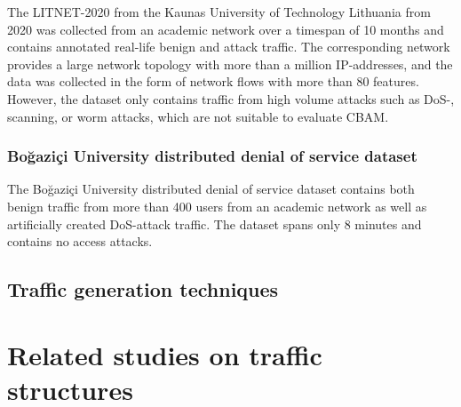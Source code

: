 The LITNET-2020 from the Kaunas University of Technology Lithuania from 2020 was collected from an academic network over a timespan of 10 months and contains annotated real-life benign and attack traffic. The corresponding network provides a large network topology with more than a million IP-addresses, and the data was collected in the form of network flows with more than 80 features. However, the dataset only contains traffic from high volume attacks such as DoS-, scanning, or worm attacks, which are not suitable to evaluate CBAM.

\subsubsection{Bo{\u{g}}azi{\c{c}}i University distributed denial of service dataset} \cite{erhan2020bougazicci}

The Bo{\u{g}}azi{\c{c}}i University distributed denial of service dataset contains both benign traffic from more than 400 users from an academic network as well as artificially created DoS-attack traffic. The dataset spans only 8 minutes and contains no access attacks.

\subsection{Traffic generation techniques}

\section{Related studies on traffic structures}

